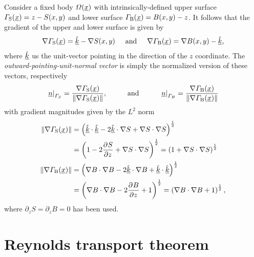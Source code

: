 Consider a fixed body $\varOmega(\underline{x})$ with intrinsically-defined upper surface $\varGamma_{\mathrm{S}}(\underline{x}) = z - S(x,y)$ and lower surface $\varGamma_{\mathrm{B}}(\underline{x}) = B(x,y) - z$.
It follows that the gradient of the upper and lower surface is given by
\begin{align*}
  \nabla \varGamma_{\mathrm{S}}(\underline{x}) = \underline{\hat{k}} - \nabla S(x,y)
  \hspace{5mm} \text{and} \hspace{5mm}
  \nabla \varGamma_{\mathrm{B}}(\underline{x}) = \nabla B(x,y) - \underline{\hat{k}},
\end{align*}
where $\underline{\hat{k}}$ us the unit-vector pointing in the direction of the $z$ coordinate.
The \emph{outward-pointing-unit-normal vector} is simply the normalized version of these vectors, respectively 
\begin{align*}
  \left. \rankone{n} \right|_{\Gamma_S} = \frac{ \nabla \Gamma_{\srf}(\rankone{x}) }{\Vert \nabla \Gamma_{\srf}(\rankone{x}) \Vert},
  \hspace{10mm} \text{and} \hspace{10mm}
  \left. \rankone{n} \right|_{\Gamma_B} = \frac{ \nabla \Gamma_{\bed}(\rankone{x}) }{\Vert \nabla \Gamma_{\bed}(\rankone{x}) \Vert}
\end{align*}
with gradient magnitudes given by the $L^2$ norm
\begin{align*}
  \Vert \nabla \varGamma_{\mathrm{S}}(\underline{x}) \Vert &= \left( \underline{\hat{k}} \cdot \underline{\hat{k}} - 2 \underline{\hat{k}} \cdot \nabla S + \nabla S \cdot \nabla S \right)^{\frac{1}{2}} \\
                                                &= \left( 1 - 2 \frac{\partial{^{}} S}{\partial z{^{}} } + \nabla S \cdot \nabla S \right)^{\frac{1}{2}} = \left( 1 + \nabla S \cdot \nabla S \right)^{\frac{1}{2}} \\ 
  \Vert \nabla \varGamma_{\mathrm{B}}(\underline{x}) \Vert &= \left( \nabla B \cdot \nabla B - 2 \underline{\hat{k}} \cdot \nabla B + \underline{\hat{k}} \cdot \underline{\hat{k}} \right)^{\frac{1}{2}} \\
                                                &= \left( \nabla B \cdot \nabla B - 2 \frac{\partial{^{}} B}{\partial z{^{}} } + 1 \right)^{\frac{1}{2}} = \left( \nabla B \cdot \nabla B + 1 \right)^{\frac{1}{2}},
\end{align*}
where $\partial_z S = \partial_z B = 0$ has been used.

\section{Reynolds transport theorem} \label{ssn_reynolds_transport_theorem}

